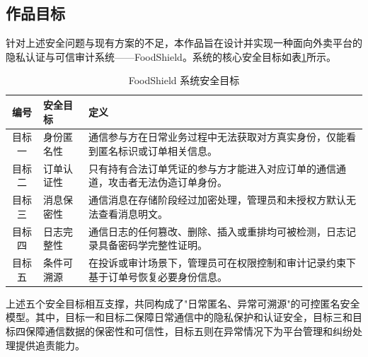 \subsection{作品目标}

针对上述安全问题与现有方案的不足，本作品旨在设计并实现一种面向外卖平台的隐私认证与可信审计系统——FoodShield。系统的核心安全目标如表\ref{tab:security-goals}所示。

\begin{table}[H]
\centering
\caption{FoodShield 系统安全目标}
\label{tab:security-goals}
\begin{tabular}{clp{8cm}}
\toprule
编号 & 安全目标 & 定义 \\
\midrule
目标一 & 身份匿名性 & 通信参与方在日常业务过程中无法获取对方真实身份，仅能看到匿名标识或订单相关信息。 \\
目标二 & 订单认证性 & 只有持有合法订单凭证的参与方才能进入对应订单的通信通道，攻击者无法伪造订单身份。 \\
目标三 & 消息保密性 & 通信消息在存储阶段经过加密处理，管理员和未授权方默认无法查看消息明文。 \\
目标四 & 日志完整性 & 通信日志的任何篡改、删除、插入或重排均可被检测，日志记录具备密码学完整性证明。 \\
目标五 & 条件可溯源 & 在投诉或审计场景下，管理员可在权限控制和审计记录约束下基于订单号恢复必要身份信息。 \\
\bottomrule
\end{tabular}
\end{table}

上述五个安全目标相互支撑，共同构成了"日常匿名、异常可溯源"的可控匿名安全模型。其中，目标一和目标二保障日常通信中的隐私保护和认证安全，目标三和目标四保障通信数据的保密性和可信性，目标五则在异常情况下为平台管理和纠纷处理提供追责能力。